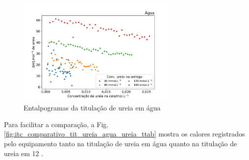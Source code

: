
\begin{figure}[h]
	\centering
	\includegraphics[width=0.7\textwidth]{imagens/itc/interacao_branco}
	\caption{Entalpogramas da titulação de ureia em água}
	\label{fig:itc_interacaoUrAgua}
\end{figure}
	
	 Para facilitar a comparação, a Fig. \ref{fig:itc_comparativo_tit_ureia_agua_ureia_ttab} mostra os calores registrados pelo equipamento tanto na titulação de ureia em água quanto na titulação de ureia em \TTAB{} 12 \mM. 
	 
